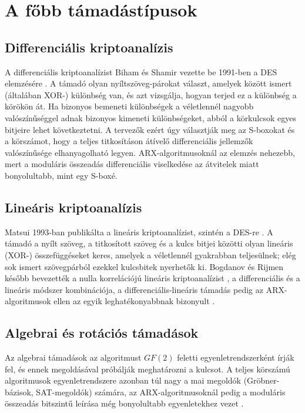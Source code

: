 \documentclass[a4paper,12pt]{report}
\theoremstyle{definition}
\theoremstyle{remark}
\begin{document}
\section{A főbb támadástípusok}\label{sec:tamadastipusok}

\subsection{Differenciális kriptoanalízis}

A differenciális kriptoanalízist Biham és Shamir vezette be 1991-ben a DES elemzésére \cite{Biham1991}. A támadó olyan nyíltszöveg-párokat választ, amelyek között ismert (általában XOR-) különbség van, és azt vizsgálja, hogyan terjed ez a különbség a körökön át. Ha bizonyos bemeneti különbségek a véletlennél nagyobb valószínűséggel adnak bizonyos kimeneti különbségeket, abból a körkulcsok egyes bitjeire lehet következtetni. A tervezők ezért úgy választják meg az S-boxokat és a körszámot, hogy a teljes titkosításon átívelő differenciális jellemzők valószínűsége elhanyagolható legyen. ARX-algoritmusoknál az elemzés nehezebb, mert a moduláris összeadás differenciális viselkedése az átvitelek miatt bonyolultabb, mint egy S-boxé.

\subsection{Lineáris kriptoanalízis}

Matsui 1993-ban publikálta a lineáris kriptoanalízist, szintén a DES-re \cite{Matsui1993}. A támadó a nyílt szöveg, a titkosított szöveg és a kulcs bitjei közötti olyan lineáris (XOR-) összefüggéseket keres, amelyek a véletlennél gyakrabban teljesülnek; elég sok ismert szövegpárból ezekkel kulcsbitek nyerhetők ki. Bogdanov és Rijmen később bevezették a nulla korrelációjú lineáris kriptoanalízist \cite{Bogdanov2014}, a differenciális és a lineáris módszer kombinációja, a differenciális-lineáris támadás pedig az ARX-algoritmusok ellen az egyik leghatékonyabbnak bizonyult \cite{Chen2023}.

\subsection{Algebrai és rotációs támadások}

Az algebrai támadások az algoritmust $GF(2)$ feletti egyenletrendszerként írják fel, és ennek megoldásával próbálják meghatározni a kulcsot. A teljes körszámú algoritmusok egyenletrendszere azonban túl nagy a mai megoldók (Gröbner-bázisok, SAT-megoldók) számára, az ARX-algoritmusoknál pedig a moduláris összeadás bitszintű leírása még bonyolultabb egyenletekhez vezet \cite{Biryukov2017}.
\end{document}

